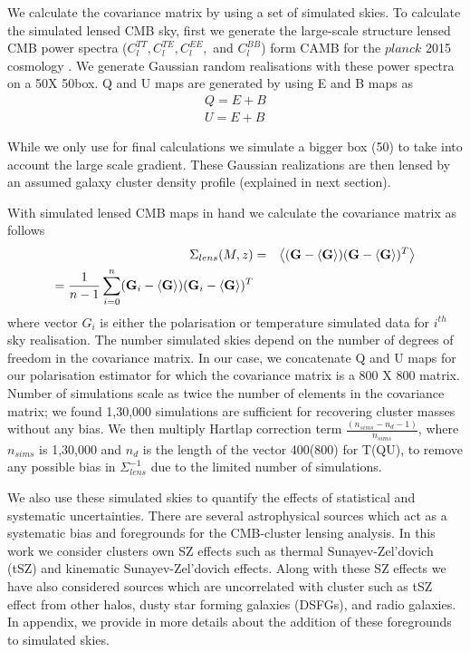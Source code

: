  We calculate the covariance matrix by using a set of simulated skies. 
 To calculate the simulated lensed CMB sky, first we generate the large-scale structure lensed CMB power spectra ($C^{TT}_{l}, C^{TE}_{l}, C^{EE}_{l},$ and $C^{BB}_{l}$) form CAMB for the $planck$ 2015 cosmology \citep{planck15_13}.  
 We generate Gaussian random realisations with these power spectra on a 50\am X 50\am box. 
 Q and U maps are generated by using E and B maps as
 \begin{eqnarray}
Q = E + B\\
U = E + B
 \label{eq:coord_trans}
 \end{eqnarray}
 
 While we only use  \smallboxsize  for final calculations we simulate a bigger box (50\am) to take into account the large scale gradient.
 These Gaussian realizations are then lensed by an assumed galaxy cluster density profile (explained in next section). 
 
 With simulated lensed CMB maps in hand we calculate the covariance matrix as follows
 \begin{eqnarray}
\Sigma_{lens}(M,z) & = & \left<(\textrm{\textbf{G}} - \left<\textrm{\textbf{G}}\right>) (\textrm{\textbf{G}} - \left<\textrm{\textbf{G}}\right>)^{T}\right>\\
  =   \frac{1}{n-1}\sum\limits_{i = 0}^{n} (\textrm{\textbf{G}}_{i} - \left<\textrm{\textbf{G}}\right>) (\textrm{\textbf{G}}_{i} - \left<\textrm{\textbf{G}}\right>)^{T} %
\label{eq_lensed_cmb_cov_mass_z}
\end{eqnarray}
 where vector $G_{i}$ is either the polarisation or temperature simulated data for $i^{th}$ sky realisation. 
 The number simulated skies depend on the number of degrees of freedom in the covariance matrix. 
 In our case, we concatenate Q and U maps for our polarisation estimator for which the covariance matrix is a 800 X 800 matrix. 
 Number of simulations scale as twice the number of elements in the covariance matrix; we found 1,30,000 simulations are sufficient for recovering cluster masses without any bias. 
  We then multiply Hartlap correction term $\frac{(n_{sims} -n_{d} -1)}{n_{sims}}$, where $n_{sims}$ is 1,30,000 and $n_{d}$ is the length of the vector 400(800) for T(QU), to remove any possible bias in $\Sigma^{-1}_{lens}$ due to the limited number of simulations. 
  
 We also use these simulated skies to quantify the effects of statistical and systematic uncertainties.
 There are several astrophysical sources which act as a systematic bias and foregrounds for the CMB-cluster lensing analysis. 
 In this work we consider clusters own SZ effects such as thermal Sunayev-Zel'dovich (tSZ) and kinematic Sunayev-Zel'dovich effects. 
 Along with these SZ effects we have also considered sources which are uncorrelated with cluster such as tSZ effect from other halos, dusty star forming galaxies (DSFGs), and radio galaxies.
 In appendix, we provide in more details about the addition of these foregrounds to simulated skies.
 
